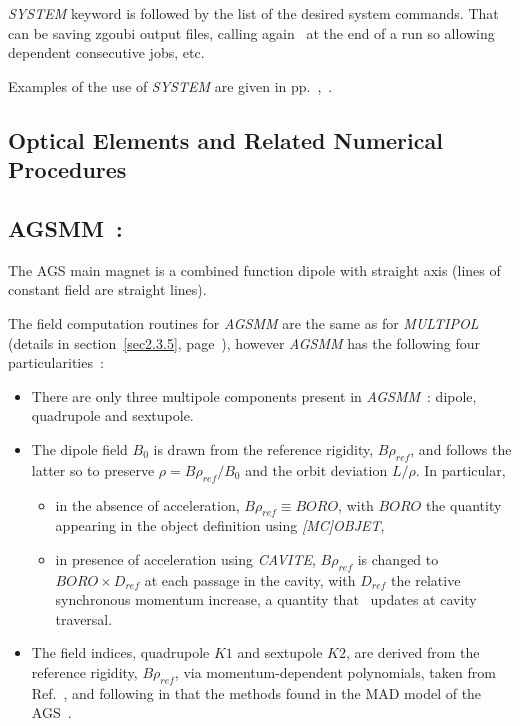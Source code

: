 {\medskip 

\noindent  \textsl{SYSTEM} keyword is followed by the list of the desired system commands. That 
can be saving zgoubi output files, calling again \zgou\ at the end of a run so allowing 
dependent consecutive jobs, etc. 


\medskip 

 Examples of the use of \textsl{SYSTEM}  are given in pp.~\pageref{ExaFITREBELOTE},~\pageref{ExaSYSTEM}.  





\clearemptydoublepage


\subsection{Optical Elements and Related Numerical Procedures} \label{sec4.4}



\subsection*{AGSMM~:  \AGSMMTitl} \label{AGSMM}
\medskip 


The AGS main magnet is a combined function dipole with straight axis (lines of constant field are straight lines).  

\noindent The field computation routines for   \textsl{AGSMM}  are the same as for \textsl{MULTIPOL} 
(details in section~\ref{sec2.3.5}, page~\pageref{sec2.3.5}), 
however  \textsl{AGSMM}  has  the following four particularities~: 

\begin{itemize}
  \item There are only three multipole components present in \textsl{AGSMM}~: dipole, quadrupole and sextupole. 
  \item The dipole field $B_0$ is drawn from the reference rigidity, $B\rho_{ref}$, and  follows the latter so to preserve 
$\rho = B\rho_{ref} / B_0$  and the orbit deviation  $L/\rho$. In particular, 
  \begin{itemize}
     \item in the absence of acceleration, $B\rho_{ref} \equiv BORO$, with $BORO$ the quantity appearing  in the object definition 
using  \textsl{[MC]OBJET}, 
     \item in presence of acceleration using \textsl{CAVITE}, $B\rho_{ref} $ is changed 
to $ BORO\times D_{ref}$    
at each passage in the cavity, with $D_{ref}$ 
the relative synchronous momentum increase, a quantity that \zgou\ updates at cavity traversal.
  \end{itemize}
  \item The field indices, quadrupole $K1$ and sextupole $K2$, are derived from  the reference rigidity, $B\rho_{ref}$, via 
 momentum-dependent polynomials, taken from Ref.~\cite{EJBleser}, 
 and following in that the methods found in the MAD model of the AGS~\cite{MADXAGSModel}. 


\end{itemize}}
